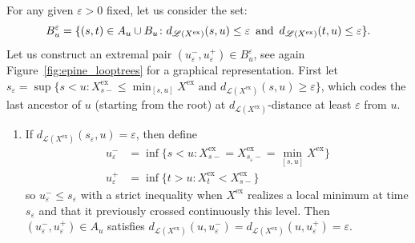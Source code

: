 \documentclass[british, a4paper,11pt]{article}
\numberwithin{equation}{section}
\theoremstyle{definition}
\newcommand{\Loop}{\mathscr{L}}
\newcommand{\exc}{\mathrm{ex}}
\begin{document}
For any given $\varepsilon>0$ fixed, let us consider the set:
\[B_u^\varepsilon = \{(s,t) \in A_u \cup B_u \colon d_{\Loop(X^{\exc})}(s,u) \leq \varepsilon \enskip\text{and}\enskip d_{\Loop(X^{\exc})}(t,u) \leq \varepsilon\}.\]
Let us construct an extremal pair $(u^-_\varepsilon, u^+_\varepsilon) \in B_u^\varepsilon$, see again Figure~\ref{fig:epine_looptrees} for a graphical representation.
First let $s_\varepsilon = \sup\{s < u \colon X^{\exc}_{s-} \leq \min_{[s,u]} X^{\exc} \text{ and } d_{\Loop(X^{\exc})}(s,u) \geq \varepsilon\}$, which codes the last ancestor of $u$ (starting from the root) at $d_{\Loop(X^{\exc})}$-distance at least $\varepsilon$ from $u$.
\begin{enumerate}
\item If $d_{\Loop(X^{\exc})}(s_\varepsilon,u) = \varepsilon$, then define
\begin{equation}
\label{eq:uplus1}
\begin{aligned}
u^-_\varepsilon &= \inf\{s < u \colon X^{\exc}_{s-} = X^{\exc}_{s_\varepsilon-} = \min_{[s,u]} X^{\exc}\}
\\
u^+_\varepsilon &= \inf\{t > u \colon X^{\exc}_{t} < X^{\exc}_{s-}\}
\end{aligned}
\end{equation}
so $u^-_\varepsilon \leq s_\varepsilon$ with a strict inequality when $X^{\exc}$ realizes a local minimum at time $s_\varepsilon$ and that it previously crossed continuously this level.
Then $(u^-_\varepsilon, u^+_\varepsilon) \in A_u$ satisfies $d_{\Loop(X^{\exc})}(u, u^-_\varepsilon) = d_{\Loop(X^{\exc})}(u, u^+_\varepsilon) = \varepsilon$.


\end{enumerate}
\end{document}
